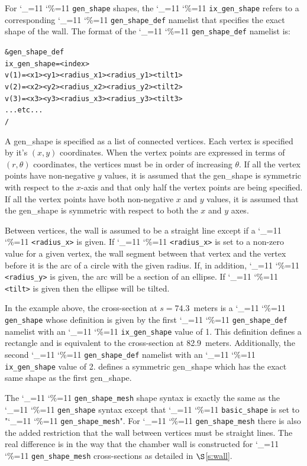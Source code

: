 \documentclass[11pt]{article}
\newcommand{\sref}[1]{$\S$\ref{#1}}
\newcommand\ttcmd{\begingroup\catcode`\_=11 \catcode`\%=11 \dottcmd}
\newcommand\dottcmd[1]{\texttt{#1}\endgroup}
\newcommand{\vn}{\ttcmd}
\newlength{\ExBeg}
\newlength{\ExEnd}
\newenvironment{example}
  {\vspace{\ExBeg} \begin{alltt}}
  {\end{alltt} \vspace{\ExEnd}}
\begin{document}
For \vn{gen_shape} shapes, the \vn{ix_gen_shape} refers to a
corresponding \vn{gen_shape_def} namelist that specifies the exact
shape of the wall.  The format of the \vn{gen_shape_def}
namelist is:
\begin{example}
  &gen_shape_def
    ix_gen_shape = <index>
    v(1) = <x1> <y1> <radius_x1> <radius_y1> <tilt1>
    v(2) = <x2> <y2> <radius_x2> <radius_y2> <tilt2>
    v(3) = <x3> <y3> <radius_x3> <radius_y3> <tilt3>
    ... etc ...
  /
\end{example}
A gen_shape is specified as a list of connected vertices. Each vertex
is specified by it's $(x, y)$ coordinates. When the vertex points are
expressed in terms of $(r, \theta)$ coordinates, the vertices must be
in order of increasing $\theta$. If all the vertex points have
non-negative $y$ values, it is assumed that the gen_shape is symmetric
with respect to the $x$-axis and that only half the vertex points are
being specified. If all the vertex points have both non-negative $x$
and $y$ values, it is assumed that the gen_shape is symmetric with
respect to both the $x$ and $y$ axes.

Between vertices, the wall is assumed to be a straight line except if
a \vn{<radius_x>} is given. If \vn{<radius_x>} is set to a non-zero
value for a given vertex, the wall segment between that vertex and the
vertex before it is the arc of a circle with the given radius. If, in
addition, \vn{<radius_y>} is given, the arc will be a section of an
ellipse.  If \vn{<tilt>} is given then the ellipse will be tilted.

In the example above, the cross-section at $s = 74.3$~meters is a
\vn{gen_shape} whose definition is given by the first
\vn{gen_shape_def} namelist with an \vn{ix_gen_shape} value of 1. This
definition defines a rectangle and is equivalent to the cross-section
at 82.9~meters. Additionally, the second \vn{gen_shape_def} namelist
with an \vn{ix_gen_shape} value of 2. defines a symmetric gen_shape
which has the exact same shape as the first gen_shape.

The \vn{gen_shape_mesh} shape syntax is exactly the same as the
\vn{gen_shape} syntax except that \vn{basic_shape} is set to
"\vn{gen_shape_mesh}". For \vn{gen_shape_mesh} there is also the added
restriction that the wall between vertices must be straight lines. The
real difference is in the way that the chamber wall is constructed for
\vn{gen_shape_mesh} cross-sections as detailed in \sref{s:wall}.

\end{document}
